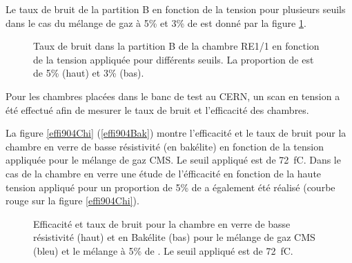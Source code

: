  Le taux de bruit de la partition B en fonction de la tension pour plusieurs seuils dans le cas du mélange de gaz à 5\% et 3\% de  est donné par la figure \ref{bruitB2}.
  
\begin{figure}[ht!]
	\centering
	\hfill
	\caption{Taux de bruit dans la partition B de la chambre RE1/1 en fonction de la tension appliquée pour différents seuils. La proportion de  est de 5\% (haut) et 3\% (bas).}
    \label{bruitB2}
\end{figure}  
  
Pour les chambres placées dans le banc de test au CERN, un scan en tension a été effectué afin de mesurer le taux de bruit et l'efficacité des chambres.

La figure \ref{effi904Chi} (\ref{effi904Bak}) montre l'efficacité et le taux de bruit pour la chambre en verre de basse résistivité (en bakélite) en fonction de la tension appliquée pour le mélange de gaz CMS. Le seuil appliqué est de \SI{72}{\femto\coulomb}. Dans le cas de la chambre en verre une étude de l'éfficacité en fonction de la haute tension appliqué pour un proportion de 5\% de  a également été réalisé (courbe rouge sur la figure \ref{effi904Chi}).
 
\begin{figure}[ht!]
	\centering
	\subfloat[]{\scalebox{1}{}\label{effi904Chi}} 
	\hfill
	\subfloat[]{\scalebox{1}{}\label{effi904Bak}}
	\caption{Efficacité et taux de bruit pour la chambre en verre de basse résistivité (haut) et en Bakélite (bas) pour le mélange de gaz CMS (bleu) et le mélange à 5\% de . Le seuil appliqué est de \SI{72}{\femto\coulomb}.}
\end{figure}  

